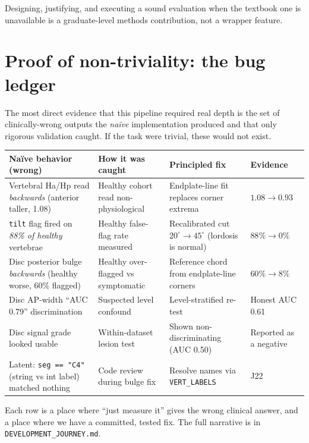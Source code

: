 \documentclass[11pt]{article}
\begin{document}
Designing, justifying, and executing a sound evaluation when the textbook one is unavailable is a
graduate-level methods contribution, not a wrapper feature.

\section{Proof of non-triviality: the bug ledger}
\label{sec:ledger}
The most direct evidence that this pipeline required real depth is the set of clinically-wrong outputs
the \emph{na\"ive} implementation produced and that only rigorous validation caught. If the task were
trivial, these would not exist.

\begin{table}[h]
\centering\small
\begin{tabularx}{\textwidth}{@{}Y Y Y l@{}}
\toprule
\textbf{Na\"ive behavior (wrong)} & \textbf{How it was caught} & \textbf{Principled fix} &
\textbf{Evidence} \\
\midrule
Vertebral Ha/Hp read \emph{backwards} (anterior taller, 1.08) & Healthy cohort read non-physiological &
Endplate-line fit replaces corner extrema & $1.08\!\to\!0.93$ \\
\texttt{tilt} flag fired on \emph{88\% of healthy} vertebrae & Healthy false-flag rate measured &
Recalibrated cut $20^\circ\!\to\!45^\circ$ (lordosis is normal) & $88\%\!\to\!0\%$ \\
Disc posterior bulge \emph{backwards} (healthy worse, 60\% flagged) & Healthy over-flagged vs
symptomatic & Reference chord from endplate-line corners & $60\%\!\to\!8\%$ \\
Disc AP-width ``AUC 0.79'' discrimination & Suspected level confound & Level-stratified re-test & Honest
AUC 0.61 \\
Disc signal grade looked usable & Within-dataset lesion test & Shown non-discriminating (AUC 0.50) &
Reported as a negative \\
Latent: \texttt{seg == "C4"} (string vs int label) matched nothing & Code review during bulge fix &
Resolve names via \texttt{VERT\_LABELS} & J22 \\
\bottomrule
\end{tabularx}
\end{table}

\noindent Each row is a place where ``just measure it'' gives the wrong clinical answer, and a place
where we have a committed, tested fix. The full narrative is in \texttt{DEVELOPMENT\_JOURNEY.md}.
\end{document}
